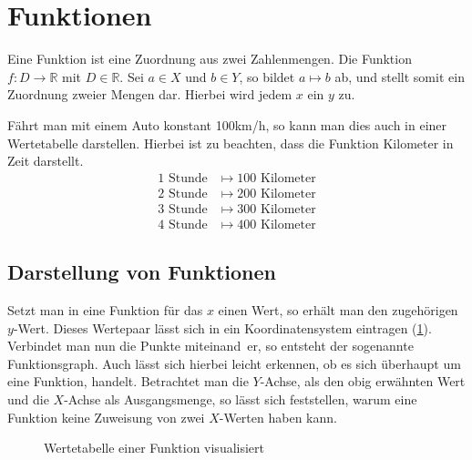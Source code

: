\section{Funktionen}\label{sec:Die Funktion}
Eine Funktion ist eine Zuordnung aus zwei Zahlenmengen. Die Funktion $f:D\rightarrow \mathbb{R}$ mit $D\in \mathbb{R}$. Sei $a\in X$ und $b\in Y$, so bildet $a\mapsto b$ ab, und stellt somit ein Zuordnung zweier Mengen dar. Hierbei wird jedem $x$ ein $y$ zu. 

\begin{beispiel} Fährt man mit einem Auto konstant 100km/h, so kann man dies auch in einer Wertetabelle darstellen. Hierbei ist zu beachten, dass die Funktion Kilometer in Zeit darstellt.
\begin{align*}
	1 \text{ Stunde}&\mapsto100 \text{ Kilometer}\\
	2 \text{ Stunde}&\mapsto200 \text{ Kilometer}\\
	3 \text{ Stunde}&\mapsto300 \text{ Kilometer}\\
	4 \text{ Stunde}&\mapsto400 \text{ Kilometer}
\end{align*}
\end{beispiel}
\subsection{Darstellung von Funktionen}\label{sec:Die Funktion/Darstellen von Funktionen}
Setzt man in eine Funktion für das $x$ einen Wert, so erhält man den zugehörigen $y$-Wert. Dieses Wertepaar lässt sich in ein Koordinatensystem eintragen (\ref{sec:Wertetabelle_einer_Funktion_visualisiert}). Verbindet man nun die Punkte miteinand er, so entsteht der sogenannte Funktionsgraph. Auch lässt sich hierbei leicht erkennen, ob es sich überhaupt um eine Funktion, handelt. Betrachtet man die $Y$-Achse, als den obig erwähnten Wert und die $X$-Achse als Ausgangsmenge, so lässt sich feststellen, warum eine Funktion keine Zuweisung von zwei $X$-Werten haben kann.
\begin{figure}[h!]
\centering
{}
\caption{Wertetabelle einer Funktion visualisiert}
\label{sec:Wertetabelle_einer_Funktion_visualisiert}
\end{figure}

 
